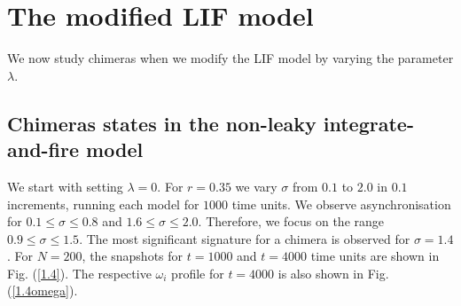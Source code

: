 \documentclass[a4paper,12pt]{article}
\begin{document}
\section{The modified LIF model}
We now study chimeras when we modify the LIF model by varying the parameter $\lambda$. 
\subsection{Chimeras states in the non-leaky integrate-and-fire model}
We start with setting $\lambda=0$. For $r=0.35$ we vary $\sigma$ from $0.1$ to $2.0$ in $0.1$ increments, running each model for $1000$ time units. We observe asynchronisation for $ 0.1 \leq \sigma \leq 0.8$ and $ 1.6 \leq \sigma \leq 2.0$. Therefore, we focus on the range $ 0.9 \leq \sigma \leq 1.5$. The most significant signature for a chimera is observed for $\sigma = 1.4$. For $N=200$, the snapshots for $t=1000$ and $t=4000$ time units are shown in Fig. (\ref{1.4}). The respective $\omega_i$ profile for $t=4000$ is also shown in Fig. (\ref{1.4omega}).
\end{document}
